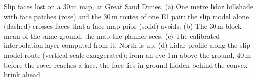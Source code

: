 Slip faces lost on a 30\,m map, at Great Sand Dunes. (a) One metre lidar hillshade with face patches (rose) and the 30\,m routes of one E1 pair: the slip model alone (dashed) crosses faces that a face map prior (solid) avoids. (b) The 30\,m block mean of the same ground, the map the planner sees. (c) The calibrated interpolation layer computed from it. North is up. (d) Lidar profile along the slip model route (vertical scale exaggerated): from an eye 1\,m above the ground, 40\,m before the rover reaches a face, the face lies in ground hidden behind the convex brink ahead.
